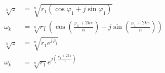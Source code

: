 \begin{boxleft}
\\
\end{boxleft}\begin{boxrightshaded}
\begin{align} 
\sqrt[n]{z}	&=\sqrt[n]{r_1\left(\cos\varphi_1+j\sin{\varphi_1}\right)}\\
\omega_k	&=\sqrt[n]{r_1}\left(\cos\left(\frac{\varphi_1+2k\pi}{n}\right)+j\sin\left(\frac{\varphi_1+2k\pi}{n}\right)\right)\\
\sqrt[n]{z}	&=\sqrt[n]{r_1e^{j\varphi_1}}\\
\omega_k	&=\sqrt[n]{r_1}e^{j\left(\frac{\varphi_1+2k\pi}{n}\right)}
\end{align}\end{boxrightshaded}